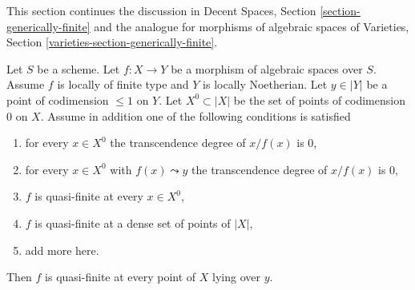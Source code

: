 \noindent
This section continues the discussion in
Decent Spaces, Section \ref{section-generically-finite}
and the analogue for morphisms of algebraic spaces of
Varieties, Section \ref{varieties-section-generically-finite}.

\begin{lemma}
\label{lemma-quasi-finite-in-codim-1}
Let $S$ be a scheme. Let $f : X \to Y$ be a morphism of algebraic spaces
over $S$. Assume $f$ is locally of finite type and $Y$ is locally Noetherian.
Let $y \in |Y|$ be a point of codimension $\leq 1$ on $Y$.
Let $X^0 \subset |X|$ be the set of points of codimension $0$ on $X$.
Assume in addition one of the following conditions is satisfied
\begin{enumerate}
\item for every $x \in X^0$ the transcendence degree of $x/f(x)$ is $0$,
\item for every $x \in X^0$ with $f(x) \leadsto y$
the transcendence degree of $x/f(x)$ is $0$,
\item $f$ is quasi-finite at every $x \in X^0$,
\item $f$ is quasi-finite at a dense set of points of $|X|$,
\item add more here.
\end{enumerate}
Then $f$ is quasi-finite at every point of $X$ lying over $y$.
\end{lemma}

